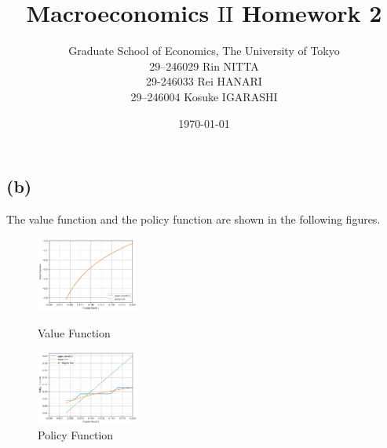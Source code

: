 \documentclass{ltjsarticle}
\title{Macroeconomics $\mathrm{II}$ Homework 2}
\date{\today}
\author{Graduate School of Economics, The University of Tokyo\\[4mm]29--246029 Rin NITTA\\ 29-246033 Rei HANARI \\ 29--246004 Kosuke IGARASHI
}
\begin{document}
\maketitle



\section{} %

\subsection*{(b)}
The value function and the policy function are shown in the following figures.
\begin{figure}[H]
    \centering
    \begin{minipage}[b]{\textwidth}
        \centering
        \includegraphics[width=0.3\textwidth]{Q1B_VF.png}
        \caption{Value Function}
        \label{fig:value_function}
    \end{minipage}
    \begin{minipage}[b]{\textwidth}
        \centering
        \includegraphics[width=0.3\textwidth]{Q1B_PF.png}
        \caption{Policy Function}
        \label{fig:policy_function}
    \end{minipage}
    \label{fig:value_and_policy_functions}
\end{figure}
\end{document}
